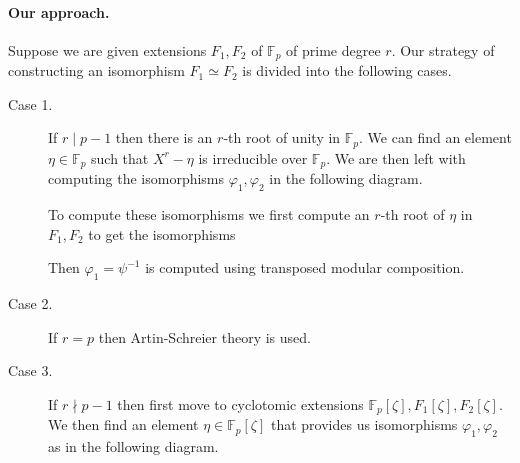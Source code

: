 \documentclass[12pt]{article}
\theoremstyle{plain}
\theoremstyle{definition}
\newcommand{\longleftmapsto}{\mathrel{\reflectbox{\ensuremath{\longmapsto}}}}
\def\F{\mathbb{F}}
\begin{document}
\paragraph{Our approach.} Suppose we are given extensions $F_1, F_2$ of $\F_p$ of prime degree $r$. Our strategy of constructing an isomorphism $F_1 \simeq F_2$ is divided into the following cases.
\begin{description}
	\item[Case 1.] If $r \mid p - 1$ then there is an $r$-th root of unity in $\F_p$. We can find an element $\eta \in \F_p$ such that $X^r - \eta$ is irreducible over $\F_p$. We are then left with computing the isomorphisms $\varphi_1, \varphi_2$ in the following diagram.
	\begin{center}
	\end{center}
	To compute these isomorphisms we first compute an $r$-th root of $\eta$ in $F_1, F_2$ to get the isomorphisms
	\begin{center}
	\end{center}
	Then $\varphi_1 = \psi^{-1}$ is computed using transposed modular composition.
	\item[Case 2.] If $r = p$ then Artin-Schreier theory is used.
	\item[Case 3.] If $r \nmid p - 1$ then first move to cyclotomic extensions $\F_p[\zeta], F_1[\zeta], F_2[\zeta]$. We then find an element $\eta \in \F_p[\zeta]$ that provides us isomorphisms $\varphi_1, \varphi_2$ as in the following diagram.

\end{description}
\end{document}
